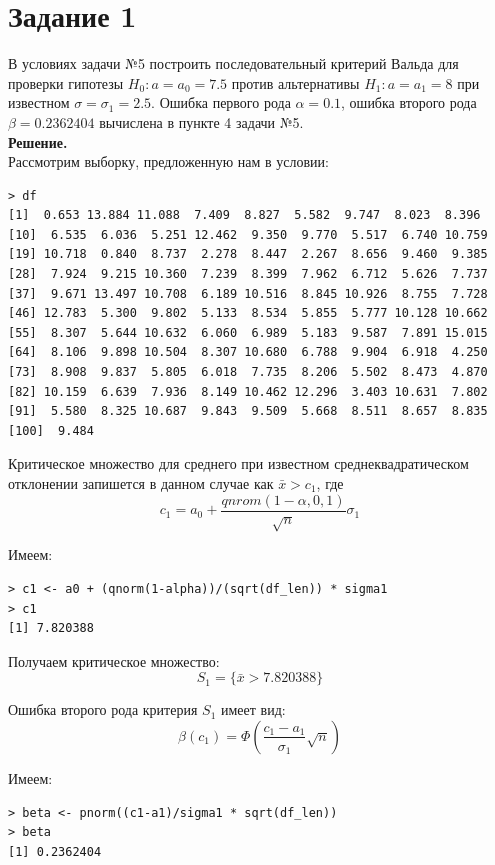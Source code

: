 \documentclass[14pt,a4paper]{scrartcl}
\begin{document}
\section*{Задание 1}\label{sec1}
В условиях задачи №5 	построить последовательный критерий Вальда для проверки гипотезы $H_0: a=a_0=7.5$  против альтернативы $H_1:a=a_1=8$ при известном $\sigma=\sigma_1=2.5$. Ошибка первого рода $\alpha = 0.1$, ошибка второго рода $\beta = 0.2362404$ вычислена в пункте 4 задачи №5.\\
\textbf{Решение.}\\
Рассмотрим выборку, предложенную нам в условии:
\begin{verbatim}
> df
[1]  0.653 13.884 11.088  7.409  8.827  5.582  9.747  8.023  8.396
[10]  6.535  6.036  5.251 12.462  9.350  9.770  5.517  6.740 10.759
[19] 10.718  0.840  8.737  2.278  8.447  2.267  8.656  9.460  9.385
[28]  7.924  9.215 10.360  7.239  8.399  7.962  6.712  5.626  7.737
[37]  9.671 13.497 10.708  6.189 10.516  8.845 10.926  8.755  7.728
[46] 12.783  5.300  9.802  5.133  8.534  5.855  5.777 10.128 10.662
[55]  8.307  5.644 10.632  6.060  6.989  5.183  9.587  7.891 15.015
[64]  8.106  9.898 10.504  8.307 10.680  6.788  9.904  6.918  4.250
[73]  8.908  9.837  5.805  6.018  7.735  8.206  5.502  8.473  4.870
[82] 10.159  6.639  7.936  8.149 10.462 12.296  3.403 10.631  7.802
[91]  5.580  8.325 10.687  9.843  9.509  5.668  8.511  8.657  8.835
[100]  9.484
\end{verbatim}

Критическое множество для среднего при известном среднеквадратическом отклонении запишется в данном случае как $\bar{x} > c_1$, где
\begin{equation*}
c_1 = a_0 + \frac{qnrom(1-\alpha,0,1)}{\sqrt{n}}\sigma_1
\end{equation*}

Имеем:
\begin{verbatim}
> c1 <- a0 + (qnorm(1-alpha))/(sqrt(df_len)) * sigma1
> c1
[1] 7.820388
\end{verbatim}

Получаем критическое множество:
\begin{equation*}
	S_1 = \{\bar{x} > 7.820388\}
\end{equation*}

Ошибка второго рода критерия $S_1$ имеет вид:
\begin{equation*}
\beta(c_1) = \Phi(\frac{c_1-a_1}{\sigma_1}\sqrt{n})
\end{equation*}

\newpage
Имеем:
\begin{verbatim}
> beta <- pnorm((c1-a1)/sigma1 * sqrt(df_len))
> beta
[1] 0.2362404
\end{verbatim}
\end{document}
